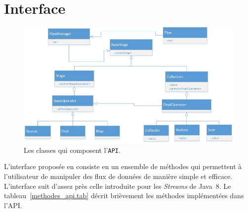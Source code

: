 \section{Interface}

\begin{figure}[ht]
\centering
     \includegraphics[width=1.0\textwidth]{Figures/ClassDiagramme.jpg}
      \caption{Les classes qui composent l'\texttt{API}.}
       \label{ClassDiagramme.fig}
\end{figure}


L'interface propos\'ee en \PpFf consiste en un ensemble de m\'ethodes qui permettent \`a l'utilisateur de manipuler des flux de donn\'ees de mani\`ere simple et efficace. L'interface suit d'assez pr\`es celle introduite pour les \emph{Streams} de Java~8. Le tableau~\ref{methodes_api.tab} d\'ecrit bri\`evement les m\'ethodes impl\'ement\'ees dans l'API.





%
%
%


